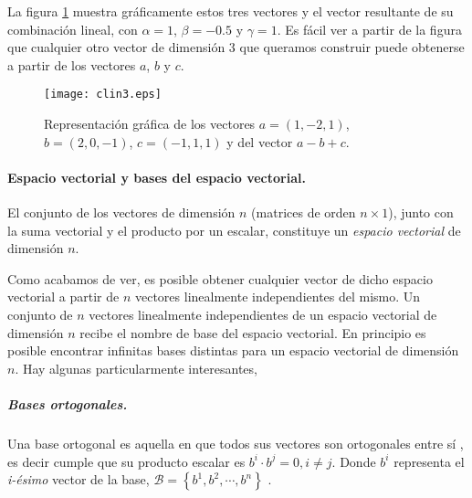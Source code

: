La figura \ref{fig:clin3} muestra gráficamente estos tres vectores y el vector resultante de su combinación lineal, con $\alpha=1$, $\beta=-0.5$ y $\gamma=1$.  Es fácil ver a partir de la figura que cualquier otro vector de dimensión $3$ que queramos construir puede obtenerse a partir de los vectores $a$, $b$ y $c$.
\begin{figure}[h]
\centering
\texttt{[image: clin3.eps]}
\caption{Representación gráfica de los vectores $a=(1,-2,1)
$, $b=(2,0,-1)$, $c=(-1,1,1)$ y del vector $a-b+c$.}
\label{fig:clin3}
\end{figure}

\paragraph{Espacio vectorial y  bases del espacio vectorial.} El conjunto de los vectores de dimensión $n$ (matrices de orden $n\times 1$), junto con la suma vectorial y el producto por un escalar, constituye  un  \emph{espacio vectorial} de dimensión $n$.

 Como acabamos de ver, es posible obtener cualquier vector de dicho espacio vectorial a partir de $n$ vectores linealmente independientes del mismo. Un conjunto de $n$ vectores linealmente independientes de un espacio vectorial de dimensión $n$ recibe el nombre de base del espacio vectorial. En principio es posible encontrar infinitas bases distintas para un espacio vectorial de dimensión $n$. Hay algunas particularmente interesantes,
 
 \subparagraph{Bases ortogonales.} Una base ortogonal es aquella en que todos sus vectores son ortogonales entre sí , es decir cumple que su producto escalar es $b^i\cdot b^j=0, i\neq j$. Donde  $b^i$ representa el \emph{i-ésimo} vector de la base, $\mathcal{B}=\left\lbrace b^1, b^2, \cdots, b^n  \right\rbrace $ .
 
